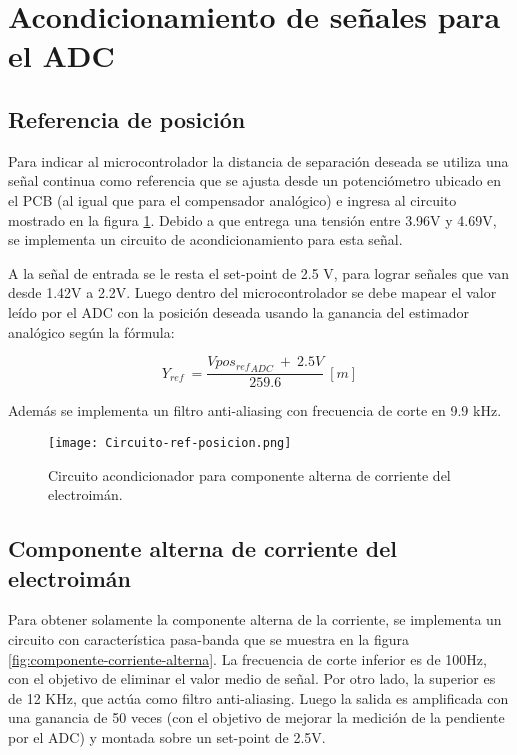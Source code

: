 \section{Acondicionamiento de señales para el ADC}

\subsection{Referencia de posición}

\noindent Para indicar al microcontrolador la distancia de separación deseada se utiliza una señal continua como referencia que se ajusta desde un potenciómetro ubicado en el PCB (al igual que para el compensador analógico) e ingresa al circuito mostrado en la figura \ref{fig:circuito-ref-posicion}. Debido a que entrega una tensión entre 3.96V y 4.69V, se implementa un circuito de acondicionamiento para esta señal.

\noindent A la señal de entrada se le resta el set-point de 2.5 V, para lograr señales que van desde 1.42V a 2.2V. Luego dentro del microcontrolador se debe mapear el valor leído por el ADC con la posición deseada usando la ganancia del estimador analógico según la fórmula:

\begin{equation} 
	Y_{ref}\ =\frac{Vpo{s_{ref}}_{ADC}\ +\ 2.5V}{259.6}\ [m]
\end{equation}

\noindent Además se implementa un filtro anti-aliasing con frecuencia de corte en 9.9 kHz.

\begin{figure}[H]
	\centering
	\texttt{[image: Circuito-ref-posicion.png]}
	\caption{Circuito acondicionador para componente alterna de corriente del electroimán.}
	\label{fig:circuito-ref-posicion}
\end{figure}

\subsection{Componente  alterna de corriente del electroimán}

\noindent Para obtener solamente la componente alterna de la corriente, se implementa un circuito con característica pasa-banda que se muestra en la figura \ref{fig:componente-corriente-alterna}. La frecuencia de corte inferior  es de 100Hz, con el objetivo de eliminar el valor medio de señal. Por otro lado, la superior es de 12 KHz, que actúa como filtro anti-aliasing. Luego la salida es amplificada con una ganancia de 50 veces (con el objetivo de mejorar la medición de la pendiente por el ADC) y montada sobre un set-point de 2.5V.

